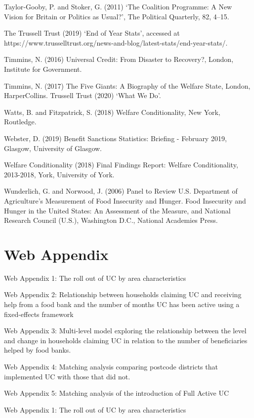 \documentclass[12pt,article,oneside]{memoir}
\begin{document}
Taylor‐Gooby, P. and Stoker, G. (2011) ‘The Coalition Programme: A New Vision for Britain or Politics as Usual?’, The Political Quarterly, 82, 4–15.

The Trussell Trust (2019) ‘End of Year Stats’, accessed at https://www.trusselltrust.org/news-and-blog/latest-stats/end-year-stats/.

Timmins, N. (2016) Universal Credit: From Disaster to Recovery?, London, Institute for Government.

Timmins, N. (2017) The Five Giants: A Biography of the Welfare State, London, HarperCollins.
Trussell Trust (2020) ‘What We Do’.

Watts, B. and Fitzpatrick, S. (2018) Welfare Conditionality, New York, Routledge.

Webster, D. (2019) Benefit Sanctions Statistics: Briefing - February 2019, Glasgow, University of Glasgow.

Welfare Conditionality (2018) Final Findings Report: Welfare Conditionality, 2013-2018, York, University of York.

Wunderlich, G. and Norwood, J. (2006) Panel to Review U.S. Department of Agriculture’s Measurement of Food Insecurity and Hunger. Food Insecurity and Hunger in the United States: An Assessment of the Measure, and National Research Council (U.S.), Washington D.C., National Academies Press.


\newpage

\section*{Web Appendix}

Web Appendix 1: The roll out of UC by area characteristics

Web Appendix 2: Relationship between households claiming UC and receiving help from a food bank and the number of months UC has been active using a fixed-effects framework

Web Appendix 3: Multi-level model exploring the relationship between the level and change in households claiming UC in relation to the number of beneficiaries helped by food banks.

Web Appendix 4: Matching analysis comparing postcode districts that implemented UC with those that did not. 

Web Appendix 5: Matching analysis of the introduction of Full Active UC


\newpage

Web Appendix 1: The roll out of UC by area characteristics
\end{document}
